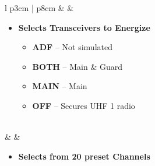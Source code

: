 \documentclass[10pt,usenames,dvipsnames,twoside]{report}
\begin{document}
\begin{center}
\begin{longtable}{l p{3cm} | p{8cm}}
			\midrule
			\textbullet &  &
			\begin{minipage}[t]{\linewidth}
				\vspace{-7pt}
				\begin{itemize}
					\item \textbf{Selects Transceivers to Energize}
					\begin{itemize}
						\item \textbf{ADF} -- Not simulated
						\item \textbf{BOTH} --  Main \& Guard
						\item \textbf{MAIN} -- Main
						\item \textbf{OFF} -- Secures UHF 1 radio
					\end{itemize}
				\end{itemize}
			\end{minipage} \\
			\midrule
			\textbullet &  &
			\begin{minipage}[t]{\linewidth}
				\vspace{-7pt}
				\begin{itemize}
					\item \textbf{Selects from 20 preset Channels}
				\end{itemize}
			\end{minipage} \\
			\bottomrule
		\end{longtable}
	\end{center}
\end{document}
